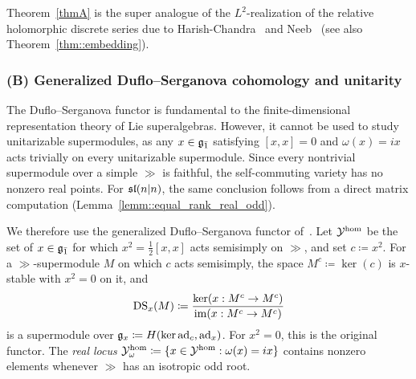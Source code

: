 Theorem~\ref{thmA} is the super analogue of the $L^2$-realization of the relative holomorphic discrete series due to Harish-Chandra~\cite{HC_VI} and Neeb~\cite{NeebSquareIntegrable} (see also Theorem~\ref{thm::embedding}). 

\subsubsection*{(B) Generalized Duflo--Serganova cohomology and unitarity}
The Duflo--Serganova functor is fundamental to the finite-dimensional representation theory of Lie superalgebras. However, it cannot be used to study unitarizable supermodules, as any $x\in\odd$ satisfying $[x,x]=0$ and $\omega(x)=ix$ acts trivially on every unitarizable supermodule. Since every nontrivial supermodule over a simple $\gg$ is faithful, the self-commuting variety has no nonzero real points. For $\sl(n\vert n)$, the same conclusion follows from a direct matrix computation (Lemma~\ref{lemm::equal_rank_real_odd}).

We therefore use the generalized Duflo--Serganova functor of~\cite{Weissauer2010,heidersdorf2021cohomological, GorelikSherman2024,Sherman2025}. Let $\YY^{\hom}$ be the set of $x\in\odd$ for which $x^2=\frac12[x,x]$ acts semisimply on $\gg$, and set $c\coloneqq x^2$. For a $\gg$-supermodule $M$ on which $c$ acts semisimply, the space $M^c\coloneqq\ker(c)$ is $x$-stable with $x^2=0$ on it, and
\begin{equation}
\DS_x(M)\coloneqq\frac{\ker(x:M^c\to M^c)}{\im(x:M^c\to M^c)}
\end{equation}
is a supermodule over $\gg_x\coloneqq H(\ker\ad_c,\ad_x)$. For $x^2=0$, this is the original functor. The \emph{real locus} $\YY^{\hom}_\omega\coloneqq\{x\in\YY^{\hom}:\omega(x)=ix\}$ contains nonzero elements whenever $\gg$ has an isotropic odd root.

